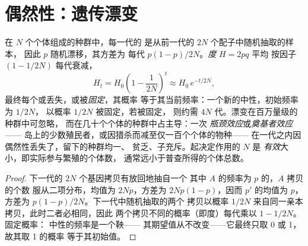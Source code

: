 \section{偶然性：遗传漂变}

\begin{theorem}[遗传漂变]\label{thm:b2:population-genetics:drift}
在 $N$ 个个体组成的种群中，每一代的
是从前一代的 $2N$ 个配子中随机抽取的样本，
因此 $p$ 随机漂移，其方差为
每代 $p(1 - p)/2N$。\emph{度} $H = 2pq$ 平均
按因子 $(1 - 1/2N)$ 每代衰减，
\[
H_t = H_0\left(1 - \frac{1}{2N}\right)^{t} \approx H_0\,e^{-t/2N},
\]
最终每个或丢失，或被\emph{固定}，其概率
等于其当前频率：一个新的中性，初始频率为 $1/2N$，
以概率 $1/2N$ 被固定，若被固定，
则约需 $4N$ 代。漂变在百万量级的种群中可忽略，
而在几十个个体的种群中占主导：一次
\emph{瓶颈效应}或\emph{奠基者效应}——
岛上的少数殖民者，或因猎杀而减至仅一百个个体的物种——
在一代之内因偶然性丢失了，留下的种群均一、
贫乏、子充斥。起决定作用的 $N$ 是
\emph{有效}大小，即实际参与繁殖的个体数，
通常远小于普查所得的个体总数。
\end{theorem}
\begin{proof}
下一代的 $2N$ 个基因拷贝有放回地抽自一个
其中 $A$ 的频率为 $p$ 的，$A$ 拷贝的个数
服从二项分布，均值为 $2Np$，方差为 $2Np(1 - p)$，因而 $p'$
的均值为 $p$，方差为 $p(1 - p)/2N$。下一代中随机抽取的两个
拷贝以概率 $1/2N$ 来自同一亲本拷贝，此时二者必相同，因此
两个拷贝不同的概率（即度）每代乘以 $1 - 1/2N$。固定概率：
中性的频率是一个鞅——
其期望值从不改变——它最终只取 0 或 1，
故其取 1 的概率
等于其初始值。
\end{proof}

